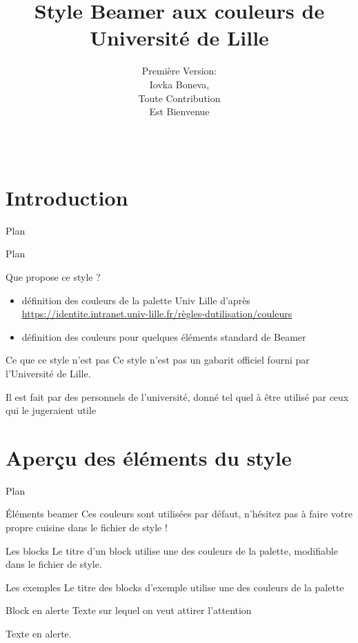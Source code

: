 \documentclass[10pt,aspectratio=169]{beamer}
\author[Collectif]{Première Version:\\Iovka Boneva,\\Toute Contribution\\Est Bienvenue}
\title[Beamer Univ Lille]{Style Beamer aux couleurs de Université de Lille}
\newcommand{\TOC}{\begin{frame}{Plan}
\tableofcontents
\end{frame}}
\newcommand{\TOCcs}{
\begin{frame}{Plan}
\tableofcontents[currentsection]
\end{frame}}
\begin{document}
{
\titlepagestyle
\begin{frame}
  \begin{columns}[c]
     \maketitle    
  \end{columns}
\end{frame}
}

\section{Introduction}
\TOC
\TOCcs

\begin{frame}{Que propose ce style ?}
  \begin{itemize}
  \item définition des couleurs de la palette Univ Lille d'après \\
    \url{https://identite.intranet.univ-lille.fr/règles-dutilisation/couleurs}
  \item définition des couleurs pour  quelques éléments standard de Beamer
  \end{itemize}
\end{frame}

\begin{frame}{Ce que ce style n'est pas}
  Ce style \alert{n'est pas un gabarit officiel} fourni par l'Université de Lille.

  \bigskip
  Il est fait par des personnels de l'université, donné tel quel à être utilisé par ceux qui le jugeraient utile
\end{frame}



\section{Aperçu des éléments du style}
\TOCcs

\begin{frame}{Éléments beamer}
  Ces couleurs sont utilisées par défaut, n'hésitez pas à faire votre propre cuisine dans le fichier de style !
  \begin{block}{Les blocks}
    Le titre d'un block utilise une des couleurs de la palette, modifiable dans le fichier de style.
  \end{block}
  \begin{exampleblock}{Les exemples}
    Le titre des blocks d'exemple utilise une des couleurs de la palette
  \end{exampleblock}
  \begin{alertblock}{Block en alerte}
    Texte sur lequel on veut attirer l'attention
  \end{alertblock}
  Texte \alert{en alerte}.
\end{frame}
\end{document}
